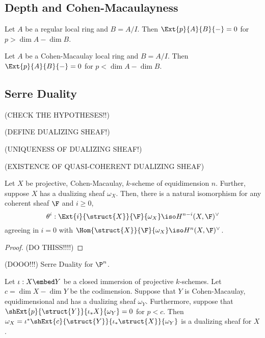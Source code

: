 \documentclass[12pt]{article}
\begin{document}
\subsection{Depth and Cohen-Macaulayness}

\begin{prop}
Let $A$ be a regular local ring and $B = A / I$. Then $\Ext{p}{A}{B}{-} = 0$ for $p > \dim{A} - \dim{B}$. 
\end{prop}

\begin{prop}
Let $A$ be a Cohen-Macaulay local ring and $B = A/I$. Then $\Ext{p}{A}{B}{-} = 0$ for $p < \dim{A} - \dim{B}$. 
\end{prop}

\subsection{Serre Duality}

(CHECK THE HYPOTHESES!!)

(DEFINE DUALIZING SHEAF!)

(UNIQUENESS OF DUALIZING SHEAF!)

(EXISTENCE OF QUASI-COHERENT DUALIZING SHEAF)

\begin{theorem}
Let $X$ be projective, Cohen-Macaulay, $k$-scheme of equidimension $n$. Further, suppose $X$ has a dualizing sheaf $\omega_X$. Then, there is a natural isomorphism for any coherent sheaf $\F$ and $i \ge 0$,
\[ \theta^i : \Ext{i}{\struct{X}}{\F}{\omega_X} \iso H^{n-i}(X, \F)^\vee \] 
agreeing in $i = 0$ with $\Hom{\struct{X}}{\F}{\omega_X} \iso H^n(X, \F)^\vee$.
\end{theorem}

\begin{proof}
(DO THISS!!!!)
\end{proof}

\begin{theorem}
(DOOO!!!) Serre Duality for $\P^n$. 
\end{theorem}


\begin{prop}
Let $\iota : X \embed Y$ be a closed immersion of projective $k$-schemes. Let $c = \dim{X} - \dim{Y}$ be the codimension. Suppose that $Y$ is Cohen-Macaulay, equidimensional and has a dualizing sheaf $\omega_Y$. Furthermore, suppose that $\shExt{p}{\struct{Y}}{\iota_* X}{\omega_Y} = 0$ for $p < c$. Then $\omega_X = \iota^* \shExt{c}{\struct{Y}}{\iota_* \struct{X}}{\omega_Y}$ is a dualizing sheaf for $X$. 
\end{prop}
\end{document}
